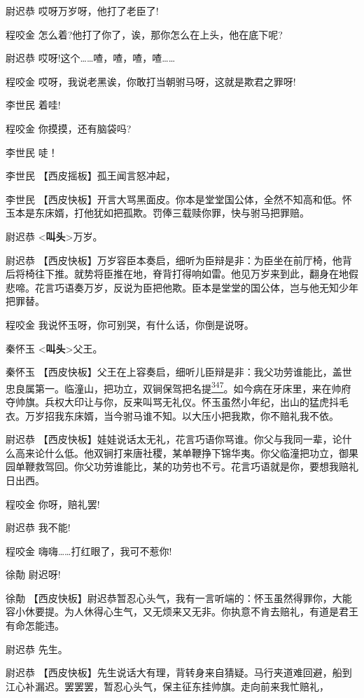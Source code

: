 尉迟恭 哎呀万岁呀，他打了老臣了!

程咬金 怎么着?他打了你了，诶，那你怎么在上头，他在底下呢?

尉迟恭 哎呀!这个\ldots{}\ldots{}喳，喳，喳，喳\ldots{}\ldots{}

程咬金 哎呀，我说老黑诶，你敢打当朝驸马呀，这就是欺君之罪呀!

李世民 着哇!

程咬金 你摸摸，还有脑袋吗?

李世民 唗！

李世民 【西皮摇板】孤王闻言怒冲起，

李世民
【西皮快板】开言大骂黑面皮。你本是堂堂国公体，全然不知高和低。怀玉本是东床婿，打他犹如把孤欺。罚俸三载赎你罪，快与驸马把罪赔。

尉迟恭 \textless{}\textbf{叫头}\textgreater{}万岁。

尉迟恭
【西皮快板】万岁容臣本奏启，细听为臣辩是非：为臣坐在前厅椅，他背后将椅往下推。就势将臣推在地，脊背打得响如雷。他见万岁来到此，翻身在地假悲啼。花言巧语奏万岁，反说为臣把他欺。臣本是堂堂的国公体，岂与他无知少年把罪替。

程咬金 我说怀玉呀，你可别哭，有什么话，你倒是说呀。

秦怀玉 \textless{}\textbf{叫头}\textgreater{}父王。

秦怀玉
【西皮快板】父王在上容奏启，细听儿臣辩是非：我父功劳谁能比，盖世忠良属第一。临潼山，把功立，双锏保驾把名提\protect\hyperlink{fn347}{\textsuperscript{347}}。如今病在牙床里，来在帅府夺帅旗。兵权大印让与你，反来叫骂无礼仪。怀玉虽然小年纪，出山的猛虎抖毛衣。万岁招我东床婿，当今驸马谁不知。以大压小把我欺，你不赔礼我不依。

尉迟恭
【西皮快板】娃娃说话太无礼，花言巧语你骂谁。你父与我同一辈，论什么高来论什么低。他双锏打来唐社稷，某单鞭挣下锦华夷。你父临潼把功立，御果园单鞭救驾回。你父功劳谁能比，某的功劳也不亏。花言巧语就是你，要想我赔礼日出西。

程咬金 你呀，赔礼罢!

尉迟恭 我不能!

程咬金 嗨嗨\ldots{}\ldots{}打红眼了，我可不惹你!

徐勣 尉迟呀!

徐勣
【西皮快板】尉迟恭暂忍心头气，我有一言听端的：怀玉虽然得罪你，大能容小休要提。为人休得心生气，又无烦来又无非。你执意不肯去赔礼，有道是君王有命怎能违。

尉迟恭 先生。

尉迟恭
【西皮快板】先生说话大有理，背转身来自猜疑。马行夹道难回避，船到江心补漏迟。罢罢罢，暂忍心头气，保主征东挂帅旗。走向前来我忙赔礼，

